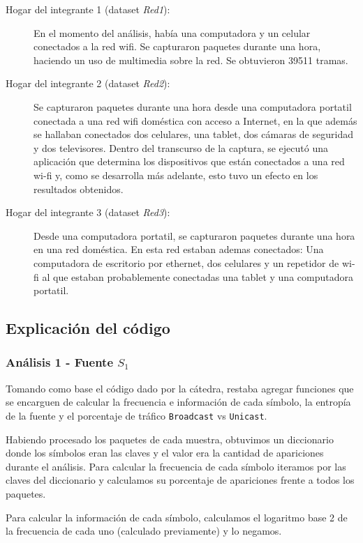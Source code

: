 \begin{description}
    \item[Hogar del integrante 1 (dataset \emph{Red1}):] En el momento del análisis, había una computadora y un celular conectados a la red wifi. Se capturaron paquetes durante una hora, haciendo un uso de multimedia sobre la red. Se obtuvieron 39511 tramas. 
    
    \item[Hogar del integrante 2 (dataset \emph{Red2}):] Se capturaron paquetes durante una hora desde una computadora portatil conectada a una red wifi doméstica con acceso a Internet, en la que además se hallaban conectados dos celulares, una tablet, dos cámaras de seguridad y dos televisores. Dentro del transcurso de la captura, se ejecutó una aplicación que determina los dispositivos que están conectados a una red wi-fi y, como se desarrolla más adelante, esto tuvo un efecto en los resultados obtenidos.
    
    \item[Hogar del integrante 3 (dataset \emph{Red3}):] Desde una computadora portatil, se capturaron paquetes durante una hora en una red doméstica. En esta red estaban ademas conectados: Una computadora de escritorio por ethernet, dos celulares y un repetidor de wi-fi al que estaban probablemente conectadas una tablet y una computadora portatil.

\end{description}

\subsection{Explicación del código}
\subsubsection{Análisis 1 - Fuente $S_{1}$}
Tomando como base el código dado por la cátedra, restaba agregar funciones que se encarguen de calcular la frecuencia e información de cada símbolo, la entropía de la fuente y el porcentaje de tráfico \texttt{Broadcast} vs \texttt{Unicast}.

Habiendo procesado los paquetes de cada muestra, obtuvimos un diccionario donde los símbolos eran las claves y el valor era la cantidad de apariciones durante el análisis. Para calcular la frecuencia de cada símbolo iteramos por las claves del diccionario y calculamos su porcentaje de apariciones frente a todos los paquetes.

Para calcular la información de cada símbolo, calculamos el logaritmo base 2 de la frecuencia de cada uno (calculado previamente) y lo negamos.
 
